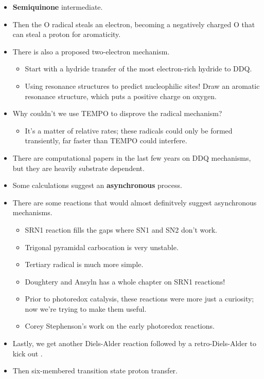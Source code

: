 \documentclass[../notes.tex]{subfiles}
\begin{document}
\begin{itemize}
    \item \textbf{Semiquinone} intermediate.
    \item Then the O radical steals an electron, becoming a negatively charged O that can steal a proton for aromaticity.
    \item There is also a proposed two-electron mechanism.
    \begin{itemize}
        \item Start with a hydride transfer of the most electron-rich hydride to DDQ.
        \item Using resonance structures to predict nucleophilic sites! Draw an aromatic resonance structure, which puts a positive charge on oxygen.
    \end{itemize}
    \item Why couldn't we use TEMPO to disprove the radical mechanism?
    \begin{itemize}
        \item It's a matter of relative rates; these radicals could only be formed transiently, far faster than TEMPO could interfere.
    \end{itemize}
    \item There are computational papers in the last few years on DDQ mechanisms, but they are heavily substrate dependent.
    \item Some calculations suggest an \textbf{asynchronous} process.
    \item There are some reactions that would almost definitvely suggest asynchronous mechanisms.
    \begin{itemize}
        \item SRN1 reaction fills the gaps where SN1 and SN2 don't work.
        \item Trigonal pyramidal carbocation is very unstable.
        \item Tertiary radical is much more simple.
        \item Doughtery and Ansyln has a whole chapter on SRN1 reactions!
        \item Prior to photoredox catalysis, these reactions were more just a curiosity; now we're trying to make them useful.
        \item Corey Stephenson's work on the early photoredox reactions.
    \end{itemize}
    \item Lastly, we get another Diels-Alder reaction followed by a retro-Diels-Alder to kick out .
    \item Then six-membered transition state proton transfer.

\end{itemize}
\end{document}
